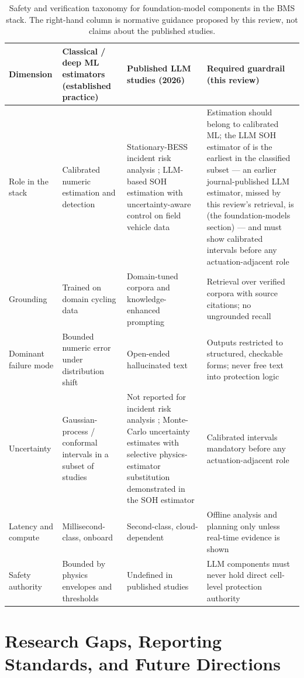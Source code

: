 \documentclass[journal]{IEEEtran}
\begin{document}
\begin{table}[!t]
\caption{Safety and verification taxonomy for foundation-model components in the BMS stack. The right-hand column is normative guidance proposed by this review, not claims about the published studies.}
\label{tab:TABLE_LLM}
\centering
\footnotesize
\begin{tabular}{|p{0.57in}|p{1.64in}|p{2.16in}|p{2.16in}|}
\hline
\textbf{Dimension} & \textbf{Classical / deep ML estimators (established practice)} & \textbf{Published LLM studies (2026)} & \textbf{Required guardrail (this review)} \\
\hline
Role in the stack & Calibrated numeric estimation and detection & Stationary-BESS incident risk analysis \cite{r14}; LLM-based SOH estimation with uncertainty-aware control on field vehicle data \cite{r15} & Estimation should belong to calibrated ML; the LLM SOH estimator of \cite{r15} is the earliest in the classified subset --- an earlier journal-published LLM estimator, missed by this review's retrieval, is \cite{r29} (the foundation-models section) --- and must show calibrated intervals before any actuation-adjacent role \\
Grounding & Trained on domain cycling data & Domain-tuned corpora and knowledge-enhanced prompting & Retrieval over verified corpora with source citations; no ungrounded recall \\
Dominant failure mode & Bounded numeric error under distribution shift & Open-ended hallucinated text & Outputs restricted to structured, checkable forms; never free text into protection logic \\
Uncertainty & Gaussian-process / conformal intervals in a subset of studies & Not reported for incident risk analysis \cite{r14}; Monte-Carlo uncertainty estimates with selective physics-estimator substitution demonstrated in the SOH estimator \cite{r15} & Calibrated intervals mandatory before any actuation-adjacent role \\
Latency and compute & Millisecond-class, onboard & Second-class, cloud-dependent & Offline analysis and planning only unless real-time evidence is shown \\
Safety authority & Bounded by physics envelopes and thresholds & Undefined in published studies & LLM components must never hold direct cell-level protection authority \\
\hline
\end{tabular}
\end{table}

\section{Research Gaps, Reporting Standards, and Future Directions}
\end{document}

